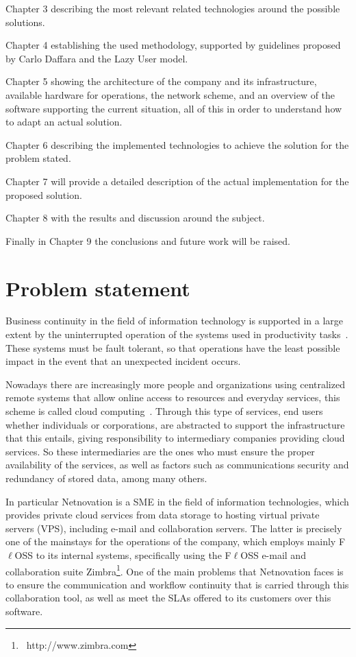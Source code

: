 \documentclass[a4paper, 12pt]{book}
\begin{document}
\noindent Chapter 3 describing the most relevant related technologies around the possible solutions.\bigskip

\noindent Chapter 4 establishing the used methodology, supported by guidelines proposed by Carlo Daffara and the Lazy User model.\bigskip

\noindent Chapter 5 showing the architecture of the company and its infrastructure, available hardware for operations, the network scheme, and an overview of the software supporting the current situation, all of this in order to understand how to adapt an actual solution.\bigskip

\noindent Chapter 6 describing the implemented technologies to achieve the solution for the problem stated.\bigskip

\noindent Chapter 7 will provide a detailed description of the actual implementation for the proposed solution.\bigskip

\noindent Chapter 8 with the results and discussion around the subject.\bigskip

\noindent Finally in Chapter 9 the conclusions and future work will be raised.\bigskip


%
\chapter{Problem statement}
\label{chap:problem}

Business continuity in the field of information technology is supported in a large extent by the uninterrupted operation of the systems used in productivity tasks~\cite{ISO22399}. These systems must be fault tolerant, so that operations have the least possible impact in the event that an unexpected incident occurs.\bigskip

\noindent Nowadays there are increasingly more people and organizations using centralized remote systems that allow online access to resources and everyday services, this scheme is called cloud computing~\cite{MandG}. Through this type of services, end users whether individuals or corporations, are abstracted to support the infrastructure that this entails, giving responsibility to intermediary companies providing cloud services. So these intermediaries are the ones who must ensure the proper availability of the services, as well as factors such as communications security and redundancy of stored data, among many others.\bigskip

\noindent In particular Netnovation is a SME in the field of information technologies, which provides private cloud services from data storage to hosting virtual private servers (VPS), including e-mail and collaboration servers. The latter is precisely one of the mainstays for the operations of the company, which employs mainly F$\ell$OSS to its internal systems, specifically using the F$\ell$OSS e-mail and collaboration suite Zimbra\texttrademark\footnote{\ http://www.zimbra.com}. One of the main problems that Netnovation faces is to ensure the communication and workflow continuity that is carried through this collaboration tool, as well as meet the SLAs offered to its customers over this software.\bigskip
\end{document}
